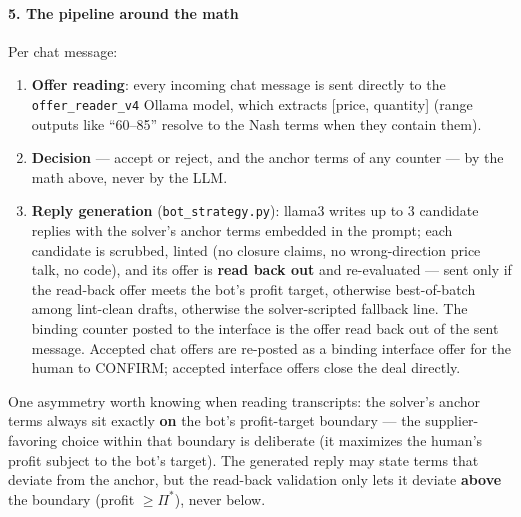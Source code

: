 \paragraph*{5. The pipeline around the math}
Per chat message:
\begin{enumerate}
    \item \textbf{Offer reading}: every incoming chat message is sent
    directly to the \texttt{offer\_reader\_v4} Ollama model, which extracts
    [price, quantity] (range outputs like
    ``60--85'' resolve to the Nash terms when they contain them).
    \item \textbf{Decision} --- accept or reject, and the anchor terms of
    any counter --- by the math above, never by the LLM.
    \item \textbf{Reply generation} (\texttt{bot\_strategy.py}): llama3
    writes up to 3 candidate replies with the solver's anchor terms
    embedded in the prompt; each candidate is scrubbed, linted (no closure
    claims, no wrong-direction price talk, no code), and its offer is
    \textbf{read back out} and re-evaluated --- sent only if the read-back
    offer meets the bot's profit target, otherwise best-of-batch among
    lint-clean drafts, otherwise the solver-scripted fallback line. The
    binding counter posted to the interface is the offer read back out of
    the sent message. Accepted chat offers are re-posted as a binding
    interface offer for the human to CONFIRM; accepted interface offers
    close the deal directly.
\end{enumerate}

One asymmetry worth knowing when reading transcripts: the solver's anchor
terms always sit exactly \textbf{on} the bot's profit-target boundary ---
the supplier-favoring choice within that boundary is deliberate (it
maximizes the human's profit subject to the bot's target). The generated
reply may state terms that deviate from the anchor, but the read-back
validation only lets it deviate \textbf{above} the boundary (profit
$\ge \Pi^*$), never below.

